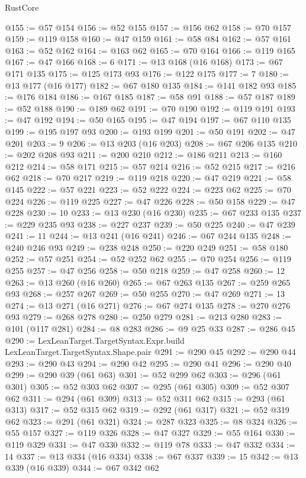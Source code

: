 \begin{lexlean}{RustCore}
\begin{coremodule}
@155 := @57 @154
@156 := @52 @155
@157 := @156 @62
@158 := @70 @157
@159 := @119 @158
@160 := @47 @159
@161 := @58 @84
@162 := @57 @161
@163 := @52 @162
@164 := @163 @62
@165 := @70 @164
@166 := @119 @165
@167 := @47 @166
@168 := 6
@171 := @13 @168 (@16 @168)
@173 := @67 @171 @135
@175 := @125 @173 @93
@176 := @122 @175
@177 := 7
@180 := @13 @177 (@16 @177)
@182 := @67 @180 @135
@184 := @141 @182 @93
@185 := @176 @184
@186 := @167 @185
@187 := @58 @91
@188 := @57 @187
@189 := @52 @188
@190 := @189 @62
@191 := @70 @190
@192 := @119 @191
@193 := @47 @192
@194 := @50 @165
@195 := @47 @194
@197 := @67 @110 @135
@199 := @195 @197 @93
@200 := @193 @199
@201 := @50 @191
@202 := @47 @201
@203 := 9
@206 := @13 @203 (@16 @203)
@208 := @67 @206 @135
@210 := @202 @208 @93
@211 := @200 @210
@212 := @186 @211
@213 := @160 @212
@214 := @58 @171
@215 := @57 @214
@216 := @52 @215
@217 := @216 @62
@218 := @70 @217
@219 := @119 @218
@220 := @47 @219
@221 := @58 @145
@222 := @57 @221
@223 := @52 @222
@224 := @223 @62
@225 := @70 @224
@226 := @119 @225
@227 := @47 @226
@228 := @50 @158
@229 := @47 @228
@230 := 10
@233 := @13 @230 (@16 @230)
@235 := @67 @233 @135
@237 := @229 @235 @93
@238 := @227 @237
@239 := @50 @225
@240 := @47 @239
@241 := 11
@244 := @13 @241 (@16 @241)
@246 := @67 @244 @135
@248 := @240 @246 @93
@249 := @238 @248
@250 := @220 @249
@251 := @58 @180
@252 := @57 @251
@254 := @52 @252 @62
@255 := @70 @254
@256 := @119 @255
@257 := @47 @256
@258 := @50 @218
@259 := @47 @258
@260 := 12
@263 := @13 @260 (@16 @260)
@265 := @67 @263 @135
@267 := @259 @265 @93
@268 := @257 @267
@269 := @50 @255
@270 := @47 @269
@271 := 13
@274 := @13 @271 (@16 @271)
@276 := @67 @274 @135
@278 := @270 @276 @93
@279 := @268 @278
@280 := @250 @279
@281 := @213 @280
@283 := @101 (@117 @281)
@284 := @8 @283
@286 := @9 @25 @33
@287 := @286 @45
@290 := LexLeanTarget.TargetSyntax.Expr.build LexLeanTarget.TargetSyntax.Shape.pair
@291 := @290 @45
@292 := @290 @44
@293 := @290 @43
@294 := @290 @42
@295 := @290 @41
@296 := @290 @40
@299 := @290 @39 (@61 @63)
@301 := @52 @299 @62
@303 := @296 (@61 @301)
@305 := @52 @303 @62
@307 := @295 (@61 @305)
@309 := @52 @307 @62
@311 := @294 (@61 @309)
@313 := @52 @311 @62
@315 := @293 (@61 @313)
@317 := @52 @315 @62
@319 := @292 (@61 @317)
@321 := @52 @319 @62
@323 := @291 (@61 @321)
@324 := @287 @323
@325 := @8 @324
@326 := @55 @157
@327 := @119 @326
@328 := @47 @327
@329 := @55 @164
@330 := @119 @329
@331 := @47 @330
@332 := @119 @78
@333 := @47 @332
@334 := 14
@337 := @13 @334 (@16 @334)
@338 := @67 @337
@339 := 15
@342 := @13 @339 (@16 @339)
@344 := @67 @342 @62

\end{coremodule}
\end{lexlean}
